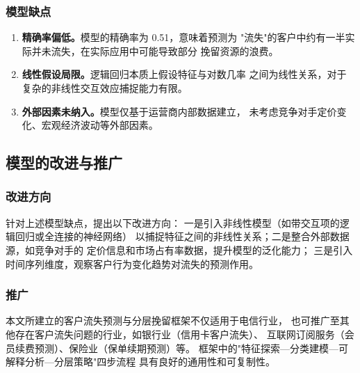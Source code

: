 \subsubsection*{模型缺点}

\begin{enumerate}
    \item \textbf{精确率偏低。}模型的精确率为 0.51，意味着预测为
    "流失"的客户中约有一半实际并未流失，在实际应用中可能导致部分
    挽留资源的浪费。
    \item \textbf{线性假设局限。}逻辑回归本质上假设特征与对数几率
    之间为线性关系，对于复杂的非线性交互效应捕捉能力有限。
    \item \textbf{外部因素未纳入。}模型仅基于运营商内部数据建立，
    未考虑竞争对手定价变化、宏观经济波动等外部因素。
\end{enumerate}

\subsection{模型的改进与推广}

\subsubsection*{改进方向}

针对上述模型缺点，提出以下改进方向：
一是引入非线性模型（如带交互项的逻辑回归或全连接的神经网络）
以捕捉特征之间的非线性关系；二是整合外部数据源，如竞争对手的
定价信息和市场占有率数据，提升模型的泛化能力；
三是引入时间序列维度，观察客户行为变化趋势对流失的预测作用。

\subsubsection*{推广}

本文所建立的客户流失预测与分层挽留框架不仅适用于电信行业，
也可推广至其他存在客户流失问题的行业，如银行业（信用卡客户流失）、
互联网订阅服务（会员续费预测）、保险业（保单续期预测）等。
框架中的"特征探索—分类建模—可解释分析—分层策略"四步流程
具有良好的通用性和可复制性。
